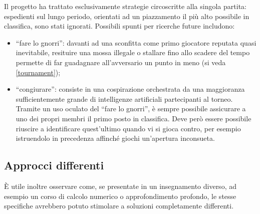 \documentclass{article}
\begin{document}
Il progetto ha trattato esclusivamente strategie circoscritte alla singola
partita: espedienti sul lungo periodo, orientati ad un piazzamento il più alto
possibile in classifica, sono stati ignorati. Possibili spunti per ricerche
future includono:
\begin{itemize}
  \item ``fare lo gnorri'': davanti ad una sconfitta come primo giocatore
    reputata quasi inevitabile, resituire una mossa illegale o stallare fino
    allo scadere del tempo permette di far guadagnare all'avversario un punto in
    meno (si veda \ref{tournament});
  \item ``congiurare'': consiste in una cospirazione orchestrata da una
    maggioranza sufficientemente grande di intelligenze artificiali partecipanti
    al torneo. Tramite un uso oculato del ``fare lo gnorri'', è sempre possibile
    assicurare a uno dei propri membri il primo posto in classifica. Deve però
    essere possibile riuscire a identificare quest'ultimo quando vi si gioca
    contro, per esempio istruendolo in precedenza affinché giochi un'apertura
    inconsueta.
\end{itemize}

\subsection{Approcci differenti}

È utile inoltre osservare come, se presentate in un insegnamento diverso, ad
esempio un corso di calcolo numerico o approfondimento profondo, le stesse
specifiche avrebbero potuto stimolare a soluzioni completamente differenti.

\pagebreak

\begin{sloppypar}
\printbibliography[
  heading=bibintoc
]
\end{sloppypar}
\end{document}
